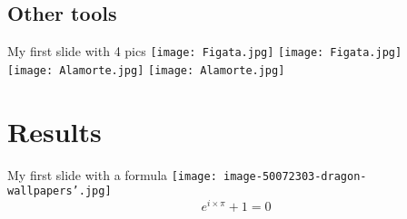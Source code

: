 \documentclass[]{beamer} %
\begin{document}
\subsection{Other tools} %

\begin{frame}{My first slide with 4 pics}
\centering
\texttt{[image: Figata.jpg]}
\texttt{[image: Figata.jpg]}
\\ %
\texttt{[image: Alamorte.jpg]}
\texttt{[image: Alamorte.jpg]}
\end{frame}


\section{Results} %


\begin{frame}{My first slide with a formula}
\centering
\texttt{[image: image-50072303-dragon-wallpapers'.jpg]}
\smallskip
\begin{equation} 
e^{i \times \pi} + 1 = 0
\end{equation}
\end{frame}

\end{document}
